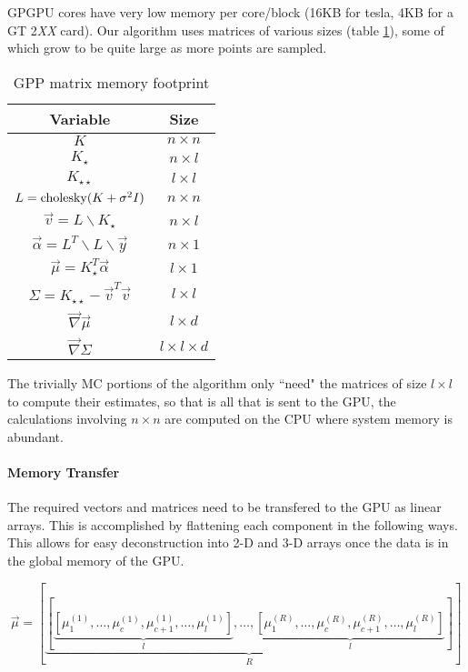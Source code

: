 \documentclass[index]{subfiles}
\begin{document}
GPGPU cores have very low memory per core/block (16KB for tesla, 4KB for a GT 2{\it XX} card). Our algorithm uses matrices of various sizes (table \ref{EPImemory}), some of which grow to be quite large as more points are sampled.

\begin{table}
    \caption{GPP matrix memory footprint}
    \label{EPImemory}
\begin{center}
    \begin{tabular}{c|c}
    Variable & Size \\
    \hline
    $K$ & $n \times n$ \\
    $K_{\star }$ & $n \times l$ \\
    $K_{\star \star }$ & $l \times l$ \\
    $L = {\rm cholesky}(K + \sigma^{2}I) $ & $n \times n$ \\
    $\vec{v} = L \backslash K_{\star }$ & $n \times l$ \\
    $\vec{\alpha} = L^{T} \backslash L \backslash \vec{y}$ & $n \times 1$ \\
    $\vec{\mu} = K_{\star }^{T}\vec{\alpha}$ & $l \times 1$  \\
    $\Sigma = K_{\star \star} - \vec{v}^{T}\vec{v}$ & $l \times l$ \\
    $\vec{\nabla} \vec{\mu}$ & $l \times d$ \\
    $\vec{\nabla} \Sigma$ & $l \times l \times d$
    \end{tabular}
\end{center}
\end{table}

The trivially MC portions of the algorithm only ``need" the matrices of size $l \times l$ to compute their estimates, so that is all that is sent to the GPU, the calculations involving $n \times n$ are computed on the CPU where system memory is abundant.

\paragraph{Memory Transfer} %
\label{ssub:Memory Transfer}

The required vectors and matrices need to be transfered to the GPU as linear arrays. This is accomplished by flattening each component in the following ways. This allows for easy deconstruction into 2-D and 3-D arrays once the data is in the global memory of the GPU.

\begin{equation}
    \vec{\mu} = \left[ \underbrace{\left[ \underbrace{\left[\mu_{1}^{(1)}, \ldots, \mu_{c}^{(1)}, \mu_{c+1}^{(1)}, \ldots, \mu_{l}^{(1)} \right]}_{l}, \ldots, \underbrace{\left[\mu_{1}^{(R)}, \ldots, \mu_{c}^{(R)}, \mu_{c+1}^{(R)}, \ldots, \mu_{l}^{(R)} \right]}_{l} \right]}_{R} \right]
\end{equation}
\end{document}
